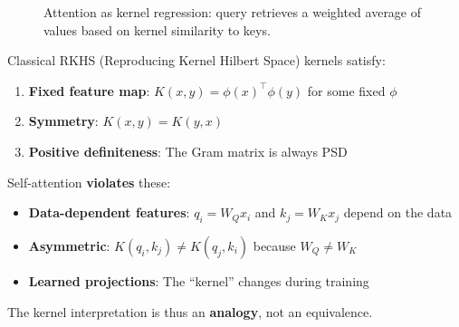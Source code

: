 \begin{figure}[h]
\centering
\caption{Attention as kernel regression: query retrieves a weighted average of values based on kernel similarity to keys.}
\end{figure}

\begin{remark}
    Classical RKHS (Reproducing Kernel Hilbert Space) kernels satisfy:
    \begin{enumerate}
        \item \textbf{Fixed feature map}: $K(x, y) = \phi(x)^\top \phi(y)$ for some fixed $\phi$
        \item \textbf{Symmetry}: $K(x, y) = K(y, x)$
        \item \textbf{Positive definiteness}: The Gram matrix is always PSD
    \end{enumerate}

    Self-attention \textbf{violates} these:
    \begin{itemize}
        \item \textbf{Data-dependent features}: $q_i = W_Q x_i$ and $k_j = W_K x_j$ depend on the data
        \item \textbf{Asymmetric}: $K(q_i, k_j) \neq K(q_j, k_i)$ because $W_Q \neq W_K$
        \item \textbf{Learned projections}: The ``kernel'' changes during training
    \end{itemize}

    The kernel interpretation is thus an \textbf{analogy}, not an equivalence.
\end{remark}

